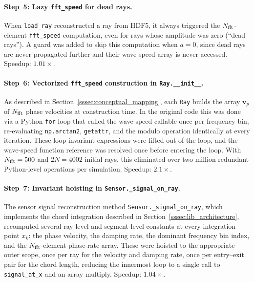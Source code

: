             \paragraph*{Step~5: Lazy \texttt{fft\_speed} for dead rays.}
            When \texttt{load\_ray} reconstructed a ray from HDF5, it always triggered the $N_{\rm fft}$-element \texttt{fft\_speed} computation, even for rays whose amplitude was zero (``dead rays'').  A guard was added to skip this computation when $a = 0$, since dead rays are never propagated further and their wave-speed array is never accessed. Speedup: $1.01\times$.

            \paragraph*{Step~6: Vectorized \texttt{fft\_speed} construction in \texttt{Ray.\_\_init\_\_}.}
            As described in Section~\ref{sssec:conceptual_mapping}, each \texttt{Ray} builds the array $\mathbf{v}_p$ of $N_{\rm fft}$ phase velocities at construction time. In the original code this was done via a Python \texttt{for} loop that called the wave-speed callable once per frequency bin, re-evaluating \texttt{np.arctan2}, \texttt{getattr}, and the modulo operation identically at every iteration. These loop-invariant expressions were lifted out of the loop, and the wave-speed function reference was resolved once before entering the loop. With $N_{\rm fft} = 500$ and $2N = 4002$ initial rays, this eliminated over two million redundant Python-level operations per simulation.  Speedup: $2.1\times$.

            \paragraph*{Step~7: Invariant hoisting in \texttt{Sensor.\_signal\_on\_ray}.}
            The sensor signal reconstruction method \texttt{Sensor.\_signal\_on\_ray}, which implements the chord integration described in Section~\ref{sssec:lib_architecture}, recomputed several ray-level and segment-level constants at every integration point $x_k$: the phase velocity, the damping rate, the dominant frequency bin index, and the $N_{\rm fft}$-element phase-rate array. These were hoisted to the appropriate outer scope, once per ray for the velocity and damping rate, once per entry--exit pair for the chord length, reducing the innermost loop to a single call to \texttt{signal\_at\_x} and an array multiply. Speedup: $1.04\times$.

